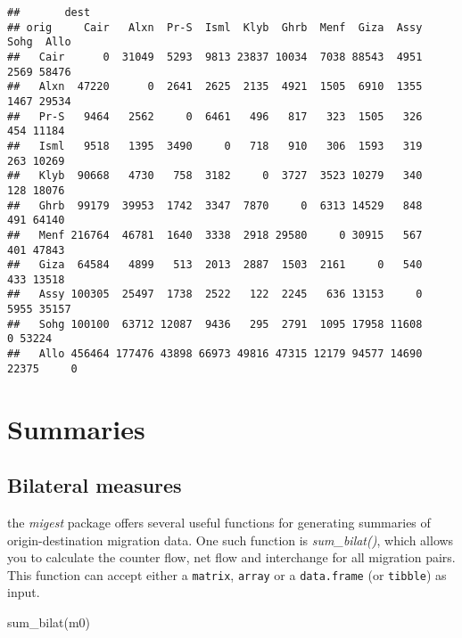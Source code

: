 \documentclass[
]{book}
\newenvironment{Shaded}{\begin{snugshade}}{\end{snugshade}}
\newcommand{\FunctionTok}[1]{\textcolor[rgb]{0.00,0.00,0.00}{#1}}
\newcommand{\NormalTok}[1]{#1}
\begin{document}
\begin{verbatim}
##       dest
## orig     Cair   Alxn  Pr-S  Isml  Klyb  Ghrb  Menf  Giza  Assy  Sohg  Allo
##   Cair      0  31049  5293  9813 23837 10034  7038 88543  4951  2569 58476
##   Alxn  47220      0  2641  2625  2135  4921  1505  6910  1355  1467 29534
##   Pr-S   9464   2562     0  6461   496   817   323  1505   326   454 11184
##   Isml   9518   1395  3490     0   718   910   306  1593   319   263 10269
##   Klyb  90668   4730   758  3182     0  3727  3523 10279   340   128 18076
##   Ghrb  99179  39953  1742  3347  7870     0  6313 14529   848   491 64140
##   Menf 216764  46781  1640  3338  2918 29580     0 30915   567   401 47843
##   Giza  64584   4899   513  2013  2887  1503  2161     0   540   433 13518
##   Assy 100305  25497  1738  2522   122  2245   636 13153     0  5955 35157
##   Sohg 100100  63712 12087  9436   295  2791  1095 17958 11608     0 53224
##   Allo 456464 177476 43898 66973 49816 47315 12179 94577 14690 22375     0
\end{verbatim}

\hypertarget{summaries}{%
\section{Summaries}\label{summaries}}

\hypertarget{bilateral-measures}{%
\subsection{Bilateral measures}\label{bilateral-measures}}

the \emph{migest} package offers several useful functions for generating summaries of origin-destination migration data. One such function is \emph{sum\_bilat()}, which allows you to calculate the counter flow, net flow and interchange for all migration pairs. This function can accept either a \texttt{matrix}, \texttt{array} or a \texttt{data.frame} (or \texttt{tibble}) as input.

\begin{Shaded}
\begin{Highlighting}[]
\FunctionTok{sum\_bilat}\NormalTok{(m0)}
\end{Highlighting}
\end{Shaded}
\end{document}
